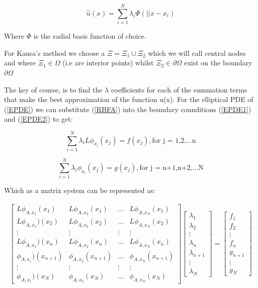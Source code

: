 \documentclass[a4paper]{amsart}
\begin{document}
\begin{equation}
\hat u(x) = \sum^{N}_{i=1} \lambda_{i} \Phi(||x - x_{i})
\label{RBFA}
\end{equation}

Where $\Phi$ is the radial basis function of choice.

For Kansa's method we choose a $\Xi = \Xi_{1} \cup \Xi_{2}$ which we will call central nodes and where $\Xi_{1} \in \Omega$ (i.e are interior points) whilst  $\Xi_{2} \in \partial \Omega$ exist on the boundary $\partial \Omega$

The key of course, is to find the $\lambda$ coefficients for each of the summation terms that make the best approximation of the function u(x). For the elliptical PDE of (\ref{EPDE}) we can substitute (\ref{RBFA}) into the boundary counditions (\ref{EPDE1}) and (\ref{EPDE2}) to get:

\begin{equation}
\sum_{i=1}^{N} \lambda_{i} L \phi_{x_{i}}(x_{j}) = f(x_{j}),\mbox{for j = 1,2,...n}
\end{equation}

\begin{equation}
\sum_{i=1}^{N} \lambda_{i} \phi_{x_{i}}(x_{j}) = g(x_{j}),\mbox{for j = n+1,n+2,...N}
\end{equation}

Which as a matrix system can be represented as:


\begin{align*}
\begin{bmatrix}
 L \phi_{A,x_{1}}(x_{1}) &L \phi_{A, x_{2}}(x_{1}) &... &L \phi_{A, x_{N}}(x_{1})\\
 L \phi_{A, x_{1}})(x_{2}) &L \phi_{A, x_{2}}(x_{2}) &... &L \phi_{A, x_{N}}(x_{2})\\
\vdots &\vdots &\vdots &\vdots\\
 L \phi_{A, x_{1}})(x_{n}) &L \phi_{A, x_{2}}(x_{n}) &... &L \phi_{A, x_{N}}(x_{n})\\
 \phi_{A, x_{1}})(x_{n+1}) &\phi_{A, x_{2}}(x_{n+1}) &...  &\phi_{A, x_{N}}(x_{n+1})\\
\vdots &\vdots &\vdots &\vdots\\
 \phi_{A, x_{1}})(x_{N})  &\phi_{A, x_{2}}(x_{N}) &...  &\phi_{A, x_{N}}(x_{N})
\end{bmatrix}
\begin{bmatrix}
\lambda_{1}\\
\lambda_{2}\\
\vdots\\
\lambda_{n}\\
\lambda_{n+1}\\
\vdots\\
\lambda_{N}
\end{bmatrix}
=
\begin{bmatrix}
f_{1}\\
f_{2}\\
\vdots\\
f_{n}\\
g_{n+1}\\
\vdots\\
g_{N}
\end{bmatrix}
\end{align*}
\end{document}
